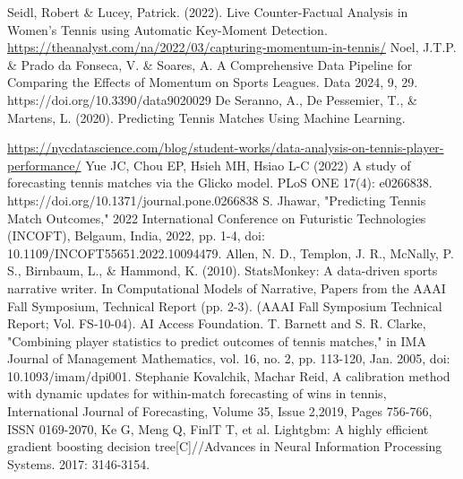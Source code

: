 \documentclass{mcmthesis}
\begin{document}
\begin{thebibliography}{99}
Seidl, Robert \& Lucey, Patrick. (2022). Live Counter-Factual Analysis in Women's Tennis using Automatic Key-Moment Detection. %
 \url{https://theanalyst.com/na/2022/03/capturing-momentum-in-tennis/}%
 Noel, J.T.P. \& Prado da Fonseca, V. \& Soares, A. A Comprehensive Data Pipeline for Comparing the Effects of Momentum on Sports Leagues. Data 2024, 9, 29. https://doi.org/10.3390/data9020029%
 De Seranno, A., De Pessemier, T., \& Martens, L. (2020). Predicting Tennis Matches Using Machine Learning.

 \url{https://nycdatascience.com/blog/student-works/data-analysis-on-tennis-player-performance/}
 Yue JC, Chou EP, Hsieh MH, Hsiao L-C (2022) A study of forecasting tennis matches via the Glicko model. PLoS ONE 17(4): e0266838. https://doi.org/10.1371/journal.pone.0266838
 S. Jhawar, "Predicting Tennis Match Outcomes," 2022 International Conference on Futuristic Technologies (INCOFT), Belgaum, India, 2022, pp. 1-4, doi: 10.1109/INCOFT55651.2022.10094479.
 Allen, N. D., Templon, J. R., McNally, P. S., Birnbaum, L., \& Hammond, K. (2010). StatsMonkey: A data-driven sports narrative writer. In Computational Models of Narrative, Papers from the AAAI Fall Symposium, Technical Report (pp. 2-3). (AAAI Fall Symposium Technical Report; Vol. FS-10-04). AI Access Foundation.
 T. Barnett and S. R. Clarke, "Combining player statistics to predict outcomes of tennis matches," in IMA Journal of Management Mathematics, vol. 16, no. 2, pp. 113-120, Jan. 2005, doi: 10.1093/imam/dpi001.
 Stephanie Kovalchik, Machar Reid,
A calibration method with dynamic updates for within-match forecasting of wins in tennis, International Journal of Forecasting, Volume 35, Issue 2,2019, Pages 756-766, ISSN 0169-2070,
 Ke G, Meng Q, FinlT T, et al. Lightgbm: A highly efficient gradient boosting decision tree[C]//Advances in Neural Information Processing Systems. 2017: 3146-3154.
    
\end{thebibliography}
% 
\end{document}

